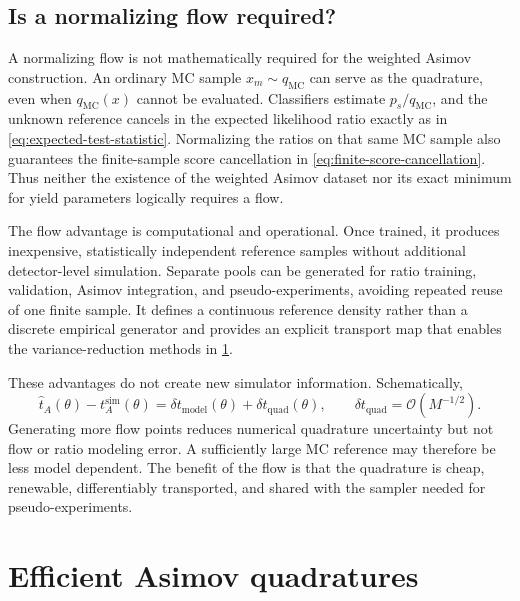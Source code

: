 \documentclass[
  aps,
  prd,
  superscriptaddress,
  nofootinbib,
  longbibliography,
  12pt
]{revtex4-2}
\begin{document}
\subsection{Is a normalizing flow required?}
\label{sec:asimov-role-of-flow}

A normalizing flow is not mathematically required for the weighted Asimov construction.  An ordinary MC sample $x_m\sim q_{\mathrm{MC}}$ can serve as the quadrature, even when $q_{\mathrm{MC}}(x)$ cannot be evaluated.  Classifiers estimate $p_s/q_{\mathrm{MC}}$, and the unknown reference cancels in the expected likelihood ratio exactly as in \cref{eq:expected-test-statistic}.  Normalizing the ratios on that same MC sample also guarantees the finite-sample score cancellation in \cref{eq:finite-score-cancellation}.  Thus neither the existence of the weighted Asimov dataset nor its exact minimum for yield parameters logically requires a flow.

The flow advantage is computational and operational.  Once trained, it produces inexpensive, statistically independent reference samples without additional detector-level simulation.  Separate pools can be generated for ratio training, validation, Asimov integration, and pseudo-experiments, avoiding repeated reuse of one finite sample.  It defines a continuous reference density rather than a discrete empirical generator and provides an explicit transport map that enables the variance-reduction methods in \cref{sec:efficient-asimov}.

These advantages do not create new simulator information.  Schematically,
\begin{equation}
  \widehat t_A(\theta)-t_A^{\mathrm{sim}}(\theta)
  =\delta t_{\mathrm{model}}(\theta)
  +\delta t_{\mathrm{quad}}(\theta),
  \qquad
  \delta t_{\mathrm{quad}}=\mathcal O(M^{-1/2}).
  \label{eq:asimov-error-decomposition}
\end{equation}
Generating more flow points reduces numerical quadrature uncertainty but not flow or ratio modeling error.  A sufficiently large MC reference may therefore be less model dependent.  The benefit of the flow is that the quadrature is cheap, renewable, differentiably transported, and shared with the sampler needed for pseudo-experiments.

\section{Efficient Asimov quadratures}
\label{sec:efficient-asimov}
\end{document}
